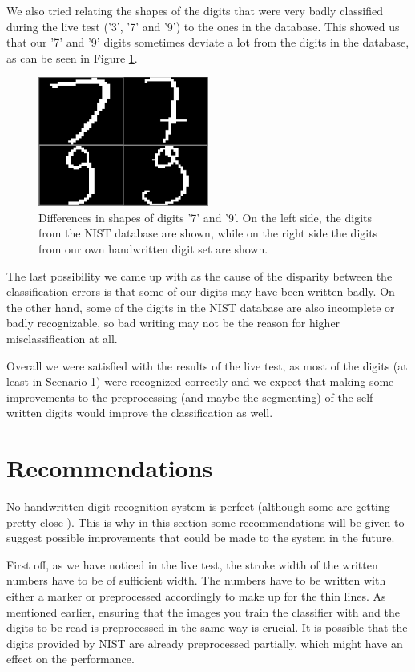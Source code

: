 \documentclass[11pt,twoside,a4paper]{article}
\begin{document}
We also tried relating the shapes of the digits that were very badly classified during the live test ('3', '7' and '9') to the ones in the database. This showed us that our '7' and '9' digits sometimes deviate a lot from the digits in the database, as can be seen in Figure \ref{img:nistvslive}.\newline
\begin{figure}[h]
  \centering
  \captionsetup{justification=centering}
  \includegraphics[width=0.5\textwidth]{NISTvsLIVE_7.png}
  \caption{Differences in shapes of digits '7' and '9'. On the left side, the digits from the NIST database are shown, while on the right side the digits from our own handwritten digit set are shown.}
  \label{img:nistvslive}
\end{figure}

The last possibility we came up with as the cause of the disparity between the classification errors is that some of our digits may have been written badly. On the other hand, some of the digits in the NIST database are also incomplete or badly recognizable, so bad writing may not be the reason for higher misclassification at all.

Overall we were satisfied with the results of the live test, as most of the digits (at least in Scenario 1) were recognized correctly and we expect that making some improvements to the preprocessing (and maybe the segmenting) of the self-written digits would improve the classification as well.

\section{Recommendations}
No handwritten digit recognition system is perfect (although some are getting pretty close \cite{mnist}). This is why in this section some recommendations will be given to suggest possible improvements that could be made to the system in the future.

First off, as we have noticed in the live test, the stroke width of the written numbers have to be of sufficient width. The numbers have to be written with either a marker or preprocessed accordingly to make up for the thin lines. As mentioned earlier, ensuring that the images you train the classifier with and the digits to be read is preprocessed in the same way is crucial. It is possible that the digits provided by NIST are already preprocessed partially, which might have an effect on the performance.
\end{document}
